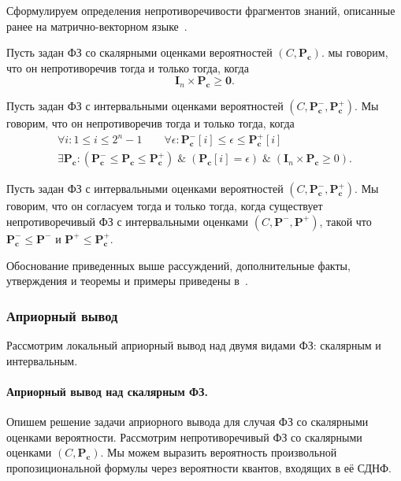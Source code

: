             Сформулируем определения непротиворечивости фрагментов знаний, описанные ранее на матрично-векторном языке~\cite{AVS_2011}.
            

            \begin{Def}
                Пусть задан ФЗ со скалярными оценками вероятностей $(C, \mathbf{P_{c}})$. мы говорим, что он непротиворечив тогда и только тогда, когда $$ \mathbf{I}_{n} \times \mathbf{P_{c}} \geq \mathbf{0}.$$
            \end{Def}

            \begin{Def}
                Пусть задан ФЗ с интервальными оценками вероятностей $(C, \mathbf{P^{-}_{c}}, \mathbf{P^{+}_{c}})$. Мы говорим, что он непротиворечив тогда и только тогда, когда 
                \begin{eqnarray*}
                    \forall i : 1 \leq i \leq 2^{n} -1 \qquad \forall \epsilon : \mathbf{P^{-}_{c}}[i] \leq \epsilon \leq \mathbf{P^{+}_{c}}[i]  \\ \exists \mathbf{P_{c}} : 
                    (\mathbf{P^{-}_{c}} \leq \mathbf{P_{c}} \leq \mathbf{P^{+}_{c}})\; \&\; (\mathbf{P_{c}}[i] = \epsilon)\; \&\; (\mathbf{I}_{n} \times \mathbf{P_{c}} \geq 0).
                \end{eqnarray*}
            \end{Def}

            \begin{Def}
                Пусть задан ФЗ с интервальными оценками вероятностей $(C, \mathbf{P^{-}_{c}}, \mathbf{P^{+}_{c}})$. Мы говорим, что он согласуем тогда и только тогда, когда  существует непротиворечивый ФЗ с интервальными оценками $(C, \mathbf{P^{-}}, \mathbf{P^{+}})$, такой что $ \mathbf{P^{-}_{c}} \leq \mathbf{P^{-}}$ и $ \mathbf{P^{+}} \leq \mathbf{P^{+}_{c}}$.
            \end{Def}
            
            Обоснование приведенных выше рассуждений, дополнительные факты, утверждения и теоремы и  примеры приведены в~\cite{AVS_2011}.
            
       
        \subsubsection{Априорный вывод}
            
            Рассмотрим локальный априорный вывод над двумя видами ФЗ: скалярным и интервальным.
            
            \paragraph{Априорный вывод над скалярным ФЗ.}
                Опишем решение задачи априорного вывода для случая ФЗ со скалярными оценками вероятности.
                Рассмотрим непротиворечивый ФЗ со скалярными оценками $(C, \mathbf{P_{c}})$. Мы можем выразить вероятность произвольной пропозициональной формулы через вероятности квантов, входящих в её СДНФ.
                
